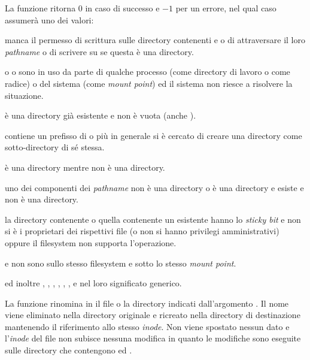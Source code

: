 \begin{funcproto}{
}
{La funzione ritorna $0$ in caso di successo e $-1$ per un errore,
  nel qual caso  assumerà uno dei valori: 
  \begin{errlist}
  \item[\errcode{EACCESS}] manca il permesso di scrittura sulle directory
    contenenti  e  o di attraversare 
    il loro \textit{pathname} o di scrivere su 
    se questa è una directory.
  \item[\errcode{EBUSY}] o  o  sono in uso da
    parte di qualche processo (come directory di lavoro o come radice) o del
    sistema (come \textit{mount point}) ed il sistema non riesce a risolvere
    la situazione.
  \item[\errcode{EEXIST}]  è una directory già esistente e
    non è vuota (anche ).
  \item[\errcode{EINVAL}]  contiene un prefisso di
     o più in generale si è cercato di creare una directory come
    sotto-directory di sé stessa.
  \item[\errcode{EISDIR}]  è una directory mentre
     non è una directory.
  \item[\errcode{ENOTDIR}] uno dei componenti dei \textit{pathname} non è una
    directory o  è una directory e 
     esiste e non è una directory.
  \item[\errval{EPERM}] la directory contenente  o quella
    contenente un  esistente hanno lo \textit{sticky bit} e non
    si è i proprietari dei rispettivi file (o non si hanno privilegi
    amministrativi) oppure il filesystem non supporta l'operazione. 
  \item[\errcode{EXDEV}]  e  non sono sullo
    stesso filesystem e sotto lo stesso \textit{mount point}. 
  \end{errlist} ed inoltre , , ,
  , , ,  e
   nel loro significato generico.}
\end{funcproto}

La funzione rinomina in  il file o la directory indicati
dall'argomento . Il nome viene eliminato nella directory
originale e ricreato nella directory di destinazione mantenendo il riferimento
allo stesso \textit{inode}. Non viene spostato nessun dato e l'\textit{inode}
del file non subisce nessuna modifica in quanto le modifiche sono eseguite
sulle directory che contengono  ed .

